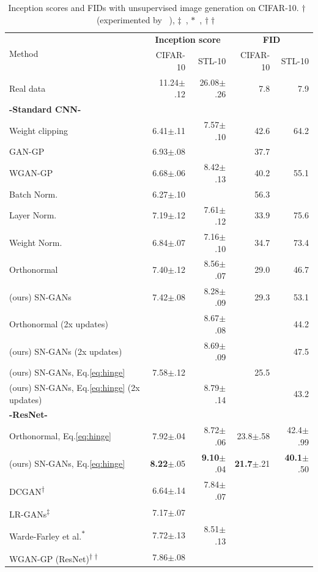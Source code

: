 \documentclass{article}
\begin{document}
\begin{table}[t]
\centering
  \caption{\label{tab:incepscores}Inception scores and FIDs with unsupervised image generation on CIFAR-10.
  $\dagger$~\cite[]{radford2015unsupervised} (experimented by ~\cite{yang2017lr}),
  $\ddagger$~\cite[]{yang2017lr}, $*$~\cite[]{warde2016improving},  $\dagger \dagger$~\cite[]{gulrajani2017improved}
  }
  \small{
  \begin{tabular}[t]{lrrrr}
    \toprule
    \multirow{2}{*}{Method} & \multicolumn{2}{c}{\textbf{Inception score}} & \multicolumn{2}{c}{\textbf{FID}} \\
    & CIFAR-10 & STL-10 & CIFAR-10 & STL-10\\
    \midrule
    Real data & 11.24$\pm$.12 & 26.08$\pm$.26 & 7.8 &7.9 \\
    \midrule
    \textbf{-Standard CNN-} \\
    Weight clipping & 6.41$\pm$.11 & 7.57$\pm$.10 & 42.6 & 64.2\\  
    GAN-GP & 6.93$\pm$.08 & & 37.7 & \\
    WGAN-GP & 6.68$\pm$.06 & 8.42$\pm$.13 & 40.2 &  55.1\\
    Batch Norm. & 6.27$\pm$.10 & & 56.3 & \\
    Layer Norm. & 7.19$\pm$.12 & 7.61$\pm$.12  & 33.9 & 75.6\\
    Weight Norm. & 6.84$\pm$.07 &7.16$\pm$.10 & 34.7 &73.4 \\
    Orthonormal & 7.40$\pm$.12& 8.56$\pm$.07 & 29.0 & 46.7 \\
    (ours) SN-GANs & 7.42$\pm$.08 &  8.28$\pm$.09 & 29.3 & 53.1 \\
    Orthonormal (2x updates) & & 8.67$\pm$.08 & & 44.2 \\
    (ours) SN-GANs (2x updates) & & 8.69$\pm$.09 & & 47.5 \\
    \midrule
    (ours) SN-GANs, Eq.\eqref{eq:hinge}  & 7.58$\pm$.12 &  & 25.5 & \\
    (ours) SN-GANs, Eq.\eqref{eq:hinge} (2x updates) && 8.79$\pm$.14 && 43.2 \\
  	\midrule
    \textbf{-ResNet-}\footnotemark \\
    Orthonormal, Eq.\eqref{eq:hinge} & 7.92$\pm$.04  & 8.72$\pm$.06 & 23.8$\pm$.58 &42.4$\pm$.99\\
    (ours) SN-GANs, Eq.\eqref{eq:hinge} &\textbf{8.22}$\pm$.05 & \textbf{9.10}$\pm$.04 & \textbf{21.7}$\pm$.21 & \textbf{40.1}$\pm$.50\\
    \midrule
    DCGAN\textsuperscript{$\dagger$} & 6.64$\pm$.14 & 7.84$\pm$.07\\
    LR-GANs\textsuperscript{$\ddagger$} &  7.17$\pm$.07\\
    Warde-Farley et al.\textsuperscript{$*$} & 7.72$\pm$.13 & 8.51$\pm$.13 \\
    WGAN-GP (ResNet)\textsuperscript{$\dagger \dagger$} & 7.86$\pm$.08 &&& \\
    \bottomrule
  \end{tabular}
  }
\end{table}
\end{document}
